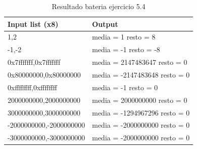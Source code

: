 	
	\begin{table}[htbp]
		\begin{center}
			\begin{tabular}{|l|l|}
				\hline
				Input list (x8) & Output \\
				\hline \hline
				1,2 &  media = 1  resto = 8  \\ \hline
				-1,-2 & media = -1  resto = -8  \\ \hline
				0x7fffffff,0x7fffffff &	media = 2147483647  resto = 0	\\ \hline
				0x80000000,0x80000000 &	media = -2147483648  resto = 0	\\ \hline
				0xffffffff,0xffffffff &	media = -1  resto = 0	\\ \hline
				2000000000,2000000000 &	media = 2000000000  resto = 0	\\ \hline
				3000000000,3000000000 &	media = -1294967296  resto = 0	\\ \hline
				-2000000000,-2000000000 & media = -2000000000  resto = 0	\\ \hline
				-3000000000,-3000000000 & media = -2000000000  resto = 0	\\ \hline
			\end{tabular}
			\caption{Resultado bateria ejercicio 5.4}
			\label{tabla:sencilla}
		\end{center}
	\end{table}
	

	


